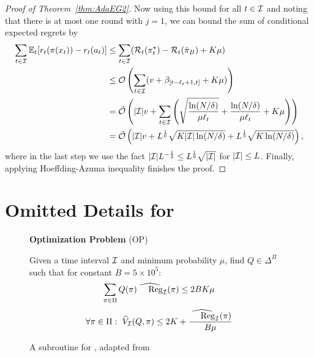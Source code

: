 \begin{proof}[Proof of Theorem~\ref{thm:AdaEG2}]
Now using this bound for all $t\in {\mathcal{I}}$ and noting that there is at most one round with $j=1$, we can bound the sum of conditional expected regrets by 
\begin{align*}
\sum_{t \in {\mathcal{I}}} \mathbb{E}_t[ r_t(\pi(x_t)) - r_t(a_t)]
&\leq {\sum_{t\in{\mathcal{I}}} ({\mathcal{R}}_t(\pi_t^\star)-{\mathcal{R}}_t(\hat{\pi}_B) + K\mu)}\\
&\leq \mathcal{O}\left({\sum_{t\in{\mathcal{I}}} (v + \beta_{[t-\ell_t+1,t]} + K\mu)}\right)\\
&=\tilde{\mathcal{O}}\left(\lvert{\mathcal{I}}\rvert v + \sum_{t\in{\mathcal{I}}} \left(\sqrt{\frac{\ln(N/\delta)}{\mu\ell_t}} + \frac{\ln(N/\delta)}{\mu\ell_t} + K\mu\right)\right) \\
&=\tilde{\mathcal{O}}\left( \lvert{\mathcal{I}}\rvert v + L^{\frac{1}{6}}\sqrt{K\lvert{\mathcal{I}}\rvert\ln(N/\delta)} + L^{\frac{1}{3}}\sqrt{K\ln(N/\delta)} \right),
\end{align*}
where in the last step we use the fact $|{\mathcal{I}}|L^{-\frac{1}{3}} \leq L^{\frac{1}{6}}\sqrt{|{\mathcal{I}}|}$ for $|{\mathcal{I}}| \leq L$.
Finally, applying Hoeffding-Azuma inequality finishes the proof.
\end{proof}


\section{Omitted Details for \AdaILTCB}\label{app:AdaILTCB2}

\begin{figure}[h]
\begin{framed}
\begin{center}
{\bf Optimization Problem} (OP)
\end{center}

Given a time interval ${\mathcal{I}}$ and minimum probability $\mu$, find $Q \in \Delta^\Pi$ such that
for constant $B = 5 \times 10^5 $:
\begin{equation}\label{eq:low_empirical_regret2}
\sum_{\pi \in \Pi} Q(\pi) \whReg_\calI(\pi) \leq 2B K \mu
\end{equation}
\begin{equation}\label{eq:low_empirical_variance2}
\forall \pi \in \Pi: ~\whV_\calI(Q, \pi) \leq 2 K + \frac{\whReg_\calI(\pi)}{B\mu}
\end{equation}
\end{framed}
\caption{A subroutine for \AdaILTCB, adapted from~\citep{AgarwalHsKaLaLiSc14}}
\label{fig:OP}
\end{figure}


